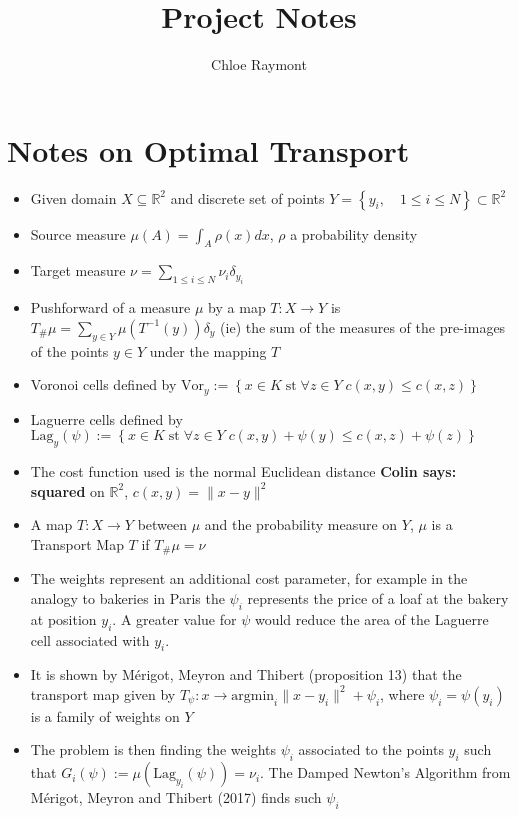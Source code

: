 \documentclass[]{article}
\title{Project Notes}
\author{Chloe Raymont}
\newcommand{\comments}[2]{{\bfseries #1 says: #2}}
\begin{document}
\maketitle

\begin{abstract}

\end{abstract}

\section{Notes on Optimal Transport}
	\begin{itemize}
		\item Given domain $X \subseteq \mathbb{R}^2$ and discrete set of points $Y = \left\lbrace y_i, \quad 1\leq i \leq N \right\rbrace  \subset \mathbb{R}^2$ 
		\item Source measure $\mu(A) = \int_A \rho(x)dx$, $\rho$ a probability density
		\item Target measure $\nu = \sum_{1\leq i \leq N}\nu_i \delta_{y_i}$ 
		\item Pushforward of a measure $\mu$ by a map $T: X \rightarrow Y$ is $T_{\#}\mu = \sum_{y \in Y} \mu \left( T^{-1}(y) \right) \delta_{y}$ (ie) the sum of the measures of the pre-images of the points $y \in Y$ under the mapping $T$
		\item Voronoi cells defined by $\text{Vor}_y := \left\lbrace x \in K \; \text{st} \; \forall z \in Y \; c(x,y) \leq c(x,z) \right\rbrace$
		\item Laguerre cells defined by $\text{Lag}_y(\psi) := \left\lbrace x \in K \; \text{st} \; \forall z \in Y \; c(x,y) + \psi(y) \leq c(x,z) + \psi(z) \right\rbrace$
		\item The cost function used is the normal Euclidean distance \comments{Colin}{squared} on $\mathbb{R}^2$, $c(x,y) = \| x-y\|^2$
		\item A map $T: X \rightarrow Y$ between $\mu$ and the probability measure on $Y$, $\mu$ is a Transport Map $T$ if $T_{\#}\mu = \nu$
		\item The weights represent an additional cost parameter, for example in the analogy to bakeries in Paris the $\psi_i$ represents the price of a loaf at the bakery at position $y_i$. A greater value for $\psi$ would reduce the area of the Laguerre cell associated with $y_i$.
		\item It is shown by M\'{e}rigot, Meyron and Thibert \cite{Merigot2017} (proposition 13) that the transport map given by $T_\psi: x \rightarrow \text{argmin}_i\| x - y_i \|^2 + \psi_i$, where $\psi_i = \psi(y_i)$ is a family of weights on $Y$
		
		\item The problem is then finding the weights $\psi_i$ associated to the points $y_i$ such that $G_i(\psi) := \mu (\text{Lag}_{y_i}(\psi)) = \nu_i$. The Damped Newton's Algorithm from M\'{e}rigot, Meyron and Thibert (2017) finds such $\psi_i$
		
	\end{itemize}
\end{document}

